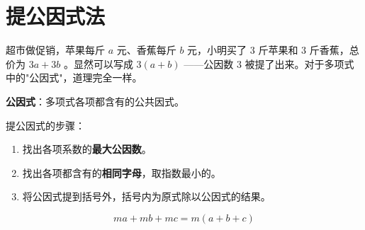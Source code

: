\section*{提公因式法}


\begin{explore}


超市做促销，苹果每斤 $a$ 元、香蕉每斤 $b$ 元，小明买了 $3$ 斤苹果和 $3$ 斤香蕉，总价为 $3a + 3b$ 。显然可以写成 $3(a + b)$ ——公因数 $3$ 被提了出来。对于多项式中的"公因式"，道理完全一样。

\end{explore}

\begin{understand}


\textbf{公因式}：多项式各项都含有的公共因式。

提公因式的步骤：

\begin{enumerate}
  \item 找出各项系数的\textbf{最大公因数}。
  \item 找出各项都含有的\textbf{相同字母}，取指数最小的。
  \item 将公因式提到括号外，括号内为原式除以公因式的结果。
\end{enumerate}


\[
ma + mb + mc = m(a + b + c)
\]


\end{understand}

